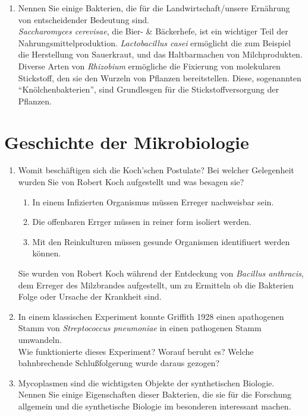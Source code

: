 \begin{enumerate}
		\item Nennen Sie einige Bakterien, die für die Landwirtschaft/unsere Ernährung von entscheidender Bedeutung sind. \hfill \\
		
		\emph{Saccharomyces cerevisae}, die Bier- \& Bäckerhefe,
		ist ein wichtiger Teil der Nahrungsmittelproduktion.
		\emph{Lactobacillus casei} ermöglicht die zum Beispiel die Herstellung von Sauerkraut,
		und das Haltbarmachen von Milchprodukten.
		Diverse Arten von \emph{Rhizobium} ermögliche die Fixierung von molekularen Stickstoff,
		den sie den Wurzeln von Pflanzen bereitstellen.
		Diese, sogenannten ``Knölchenbakterien'', sind Grundlesgen für die Stickstoffversorgung der Pflanzen.
	\end{enumerate}

\section{Geschichte der Mikrobiologie}
	\begin{enumerate}
		\item Womit beschäftigen sich die Koch’schen Postulate?
		Bei welcher Gelegenheit wurden Sie von Robert Koch aufgestellt und was besagen sie? \hfill \vspace{4mm}
	
		\begin{enumerate}[label=\arabic*)]
			\item In einem Infizierten Organismus müssen Erreger nachweisbar sein.
			\item Die offenbaren Errger müssen in reiner form isoliert werden.
			\item Mit den Reinkulturen müssen gesunde Organismen identifiuert werden können.
		\end{enumerate}
		Sie wurden von Robert Koch während der Entdeckung von \emph{Bacillus anthracis},
		dem Erreger des Milzbrandes aufgestellt,
		um zu Ermitteln ob die Bakterien Folge oder Ursache der Krankheit sind.	
		

		\item In einem klassischen Experiment konnte Griffith 1928 einen apathogenen Stamm von
		\emph{Streptococcus pneumoniae} in einen pathogenen Stamm umwandeln.\\
		Wie funktionierte dieses Experiment? Worauf beruht es? 
		Welche bahnbrechende Schlußfolgerung wurde daraus gezogen? \hfill \vspace{4mm}
	
		\item Mycoplasmen sind die wichtigsten Objekte der synthetischen Biologie. 
		Nennen Sie einige Eigenschaften dieser Bakterien,
		die sie für die Forschung allgemein und die synthetische Biologie im besonderen interessant machen. \hfill \vspace{4mm}
	\end{enumerate}

